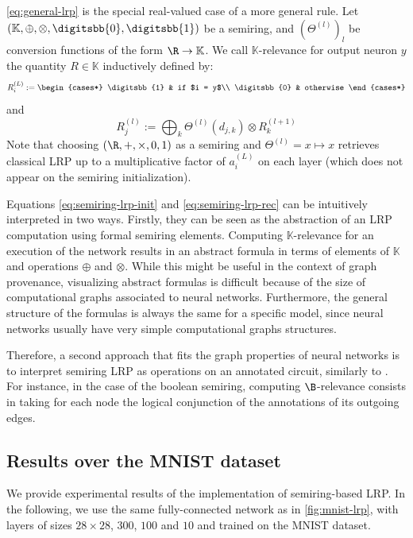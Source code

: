 \documentclass{../cs-classes/cs-classes}
\newcommand*{\K}{\mathbb{K}}
\newcommand*{\1}{\digitsbb{1}}
\newcommand*{\0}{\digitsbb{0}}
\begin{document}
\autoref{eq:general-lrp} is the special real-valued case of a more general rule. Let $(\K, \oplus, \otimes, \0, \1)$ be a semiring, and $(\Theta^{(l)})_l$ be conversion functions of the form $\R\to\K$. We call $\K$-relevance for output neuron $y$ the quantity $R\in\K$ inductively defined by:
\begin{equation}
    R^{(L)}_i := \begin{cases*}
        \1 & if $i = y$\\
        \0 & otherwise
    \end{cases*}
    \label{eq:semiring-lrp-init}
\end{equation}
and
\begin{equation}
    R^{(l)}_j := \bigoplus_{k}\Theta^{(l)}(d_{j,k}) \otimes R^{(l+1)}_k
    \label{eq:semiring-lrp-rec}
\end{equation}
Note that choosing $(\R,+,\times,0,1)$ as a semiring and $\Theta^{(l)}=x\mapsto x$ retrieves classical LRP up to a multiplicative factor of $a_i^{(L)}$ on each layer (which does not appear on the semiring initialization).

Equations \ref{eq:semiring-lrp-init} and \ref{eq:semiring-lrp-rec} can be intuitively interpreted in two ways. Firstly, they can be seen as the abstraction of an LRP computation using formal semiring elements. Computing $\K$-relevance for an execution of the network results in an abstract formula in terms of elements of $\K$ and operations $\oplus$ and $\otimes$. While this might be useful in the context of graph provenance, visualizing abstract formulas is difficult because of the size of computational graphs associated to neural networks. Furthermore, the general structure of the formulas is always the same for a specific model, since neural networks usually have very simple computational graphs structures. 

Therefore, a second approach that fits the graph properties of neural networks is to interpret semiring LRP as operations on an annotated circuit, similarly to \cite{senellart2018provenance}. For instance, in the case of the boolean semiring, computing $\B$-relevance consists in taking for each node the logical conjunction of the annotations of its outgoing edges.


\subsection{Results over the MNIST dataset}
We provide experimental results of the implementation of semiring-based LRP. In the following, we use the same fully-connected network as in \autoref{fig:mnist-lrp}, with layers of sizes $28\times28$, $300$, $100$ and $10$ and trained on the MNIST dataset.
\end{document}
